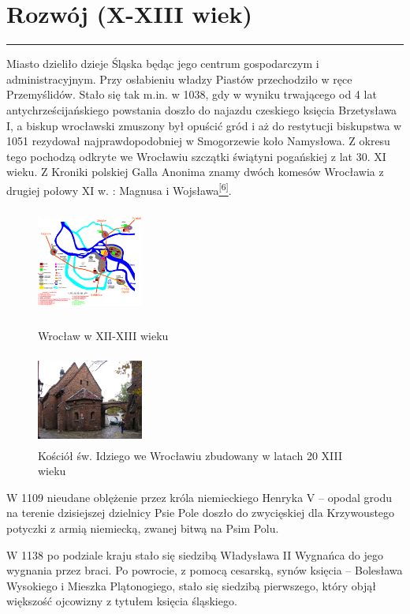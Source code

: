 \documentclass{article}
\begin{document}
\section{Rozwój (X-XIII wiek)} 
\noindent\rule{\textwidth}{0.4pt}
Miasto dzieliło dzieje Śląska będąc jego centrum gospodarczym i administracyjnym. Przy osłabieniu władzy Piastów przechodziło w ręce Przemyślidów. Stało się tak m.in. w 1038, gdy w wyniku trwającego od 4 lat antychrześcijańskiego powstania doszło do najazdu czeskiego księcia Brzetysława I, a biskup wrocławski zmuszony był opuścić gród i aż do restytucji biskupstwa w 1051 rezydował najprawdopodobniej w Smogorzewie koło Namysłowa. Z okresu tego pochodzą odkryte we Wrocławiu szczątki świątyni pogańskiej z lat 30. XI wieku. Z Kroniki polskiej Galla Anonima znamy dwóch komesów Wrocławia z drugiej połowy XI w. : Magnusa i Wojsława\hyperlink{6}{\textsuperscript{[6]}}.

\begin{figure}
    \includegraphics[width =3.5cm, height = 3.5cm]{images/Zdjecie01.png}
    \caption{Wrocław w XII-XIII wieku}
    \vspace{0.5cm}
    \includegraphics[width =3.5cm, height = 3.0cm]{images/Zdjecie02.jpg}
    \caption{Kościół św. Idziego we Wrocławiu zbudowany w latach 20 XIII wieku}
\end{figure}

W 1109 nieudane oblężenie przez króla niemieckiego Henryka V – opodal grodu na terenie dzisiejszej dzielnicy Psie Pole doszło do zwycięskiej dla Krzywoustego potyczki z armią niemiecką, zwanej bitwą na Psim Polu.

W 1138 po podziale kraju stało się siedzibą Władysława II Wygnańca do jego wygnania przez braci. Po powrocie, z pomocą cesarską, synów księcia – Bolesława Wysokiego i Mieszka Plątonogiego, stało się siedzibą pierwszego, który objął większość ojcowizny z tytułem księcia śląskiego.
\end{document}
